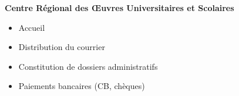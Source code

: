 \documentclass[9pt,a4paper,academicons]{altacv}
\begin{document}
\divider

\textbf{Centre Régional des Œuvres Universitaires et Scolaires}
\small{
\begin{itemize}
\item Accueil
\item Distribution du courrier
\item Constitution de dossiers administratifs
\item Paiements bancaires (CB, chèques)
\end{itemize}
}




\medskip


\newpage
\end{document}

